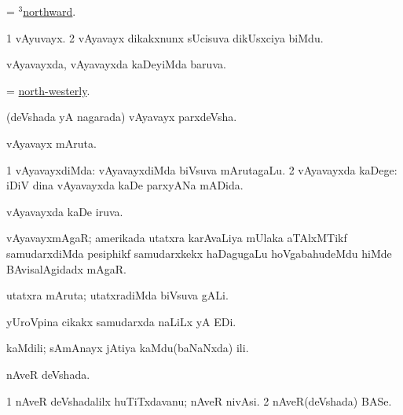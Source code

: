 \bentry
{}
\gl{\kirxvi}
\bmng
= \hyperlink{northward(3)}{$^3$northward}. 
\emng
\eentry

\bentry
{}
\gl{\nA}
\bmng
\bnum
\num{1} vAyuvayx. 
\num{2} vAyavayx dikakxnunx sUcisuva dikUsxciya biMdu. 
\enum
\emng
\eentry

\bentry
{}
\gl{\gu}
\bmng
vAyavayxda, vAyavayxda kaDeyiMda baruva. 
\emng
\eentry

\bentry
{}
\gl{\kirxvi}
\bmng
= \hyperlink{north-westerly}{north-westerly}. 
\emng
\eentry

\bentry
{}
\gl{\nA}
\bmng
(deVshada yA nagarada) vAyavayx parxdeVsha. 
\emng
\eentry

\bentry
{}
\gl{\nA}
\bmng
vAyavayx mAruta. 
\emng
\eentry

\bentry
{}
\gl{\kirxvi}
\bmng
\bnum
\num{1} vAyavayxdiMda:  vAyavayxdiMda biVsuva mArutagaLu. 
\num{2} vAyavayxda kaDege:  iDiV dina vAyavayxda kaDe parxyANa mADida. 
\enum
\emng
\eentry

\bentry
{}
\gl{\gu}
\bmng
vAyavayxda kaDe iruva. 
\emng
\eentry

\bentry
{}
\gl{\nA}
\bmng
vAyavayxmAgaR; amerikada utatxra karAvaLiya mUlaka aTAlxMTikf samudarxdiMda pesiphikf samudarxkekx haDagugaLu hoVgabahudeMdu hiMde BAvisalAgidadx mAgaR. 
\emng
\eentry

\bentry
{}
\gl{\nA}
\bmng
utatxra mAruta; utatxradiMda biVsuva gALi. 
\emng
\eentry

\bentry
{}
\gl{\nA}
\bmng
yUroVpina cikakx samudarxda naLiLx yA EDi. 
\emng
\eentry

\bentry
{}
\gl{\nA}
\bmng
kaMdili; sAmAnayx jAtiya kaMdu(baNaNxda) ili. 
\emng
\eentry

\bentry
{}
\gl{\gu}
\bmng
nAveR deVshada. 
\emng
\eentry

\bentry
{}
\gl{\nA}
\bmng
\bnum
\num{1} nAveR deVshadalilx huTiTxdavanu; nAveR nivAsi. 
\num{2} nAveR(deVshada) BASe. 
\enum
\emng
\eentry


